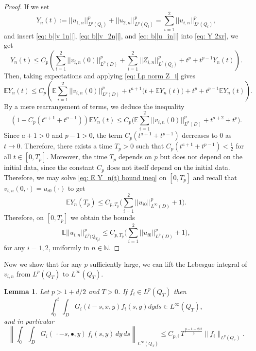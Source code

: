\documentclass[12pt]{article}
\newtheorem{lemma}{Lemma}
\theoremstyle{definition}
\theoremstyle{remark}
\begin{document}
\begin{proof}
If we set 
\begin{equation}\label{eq: Y 2xr}
Y_n(t) := ||u_{1,n}||_{L^p(Q_t)}^p+||u_{2,n}||_{L^p(Q_t)}^p = \sum_{i=1}^2 ||u_{i,n}||_{L^p(Q_t)}^p,
\end{equation}
and insert \eqref{eq: b||v 1n||}, \eqref{eq: b||v_2n||}, and \eqref{eq: b||u_in||} into \eqref{eq: Y 2xr},  we get
\begin{equation}\label{eq: Ineq for Y(t)}
Y_n(t) \leq C_{p}\left(\sum_{i=1}^2 ||v_{i,n}(0)||_{L^p(D)}^p+\sum_{i=1}^2 ||Z_{i,n}||_{L^p(Q_t)}^p+t^p+t^{p-1}Y_n(t)\right).
\end{equation}
Then, taking expectations and applying \eqref{eq: Lp norm Z_i} gives
\[
\mathbb E Y_n(t)
\le
C_{p}\left(
\mathbb E \sum_{i=1}^2 ||v_{i,n}(0)||^p_{L^p(D)}+t^{a+1}\bigl(t+\mathbb E Y_n(t)\bigr)+t^p+t^{p-1}\mathbb E Y_n(t)
\right).
\]
By a mere rearrangement of terms, we deduce the inequality
\begin{equation}\label{eq: E Y_n(t) bound ineq}
    (1-C_{p}(t^{a+1}+t^{p-1}))\mathbb EY_n(t)\leq C_{p}\Bigg(\mathbb E \sum_{i=1}^2 ||v_{i,n}(0)||_{L^p(D)}^p+t^{a+2}+t^p\Bigg).
\end{equation}
Since $a+1>0$ and $p-1>0$, the term $
C_{p}(t^{a+1}+t^{p-1})$ decreases to $0$
as $t\rightarrow 0$. Therefore, there exists a time $T_p>0$ such that $C_{p}(t^{a+1}+t^{p-1}) < \frac12$ for all $t\in [0,T_p]$. Moreover, the time $T_p$ depends on $p$ but does not depend on the initial data, since the constant $C_{p}$ does not itself depend on the initial data. Therefore, we may solve \eqref{eq: E Y_n(t) bound ineq} on $[0,T_p]$ and recall that $v_{i,n}(0,\cdot) = u_{i0}(\cdot)$ to get
\begin{equation}\label{eq: EY_n(T_0) upper bound}
\mathbb E Y_n(T_p) \leq C_{p,T_p}\Bigg(\sum\limits_{i=1}^2 ||u_{i0}||_{L^{\infty}(D)}^p+1\Bigg).
\end{equation}
Therefore, on $[0,T_p]$ we obtain the bounds
\begin{equation*}
    \mathbb E ||u_{i,n}||_{L^p(Q_{T_p)}}^p \leq C_{p,T_p}\Bigg(\sum\limits_{i=1}^2 ||u_{i0}||_{L^p(D)}^p+1\Bigg),
\end{equation*}
for any $i=1,2$, uniformly in $n\in \mathbb N$.
\end{proof}
Now we show that for any $p$ sufficiently large, we can lift the Lebesgue integral of $v_{i,n}$ from $L^p(Q_T)$ to $L^{\infty}(Q_T)$.
\begin{lemma}\label{lemma: lift L^p integral to L^infinity}
   Let $p>1+d/2$ and $T>0$. If $f_i\in L^p(Q_T)$ then 
   \[
   \int_0^t\int_D G_i(t-s,x,y)f_i(s,y)dyds\in L^{\infty}(Q_T),
   \]
and in particular
   \[
\left\|
\int_0^\cdot \int_D G_i(\,\cdot - s,\bullet,y)\, f_i(s,y)\, dy\, ds
\right\|_{L^\infty(Q_T)}
\leq
C_{p,i}\, T^{\frac{p-1-d/2}{p}}
\|f_i\|_{L^p(Q_T)}.
\]
\end{lemma}
\end{document}

